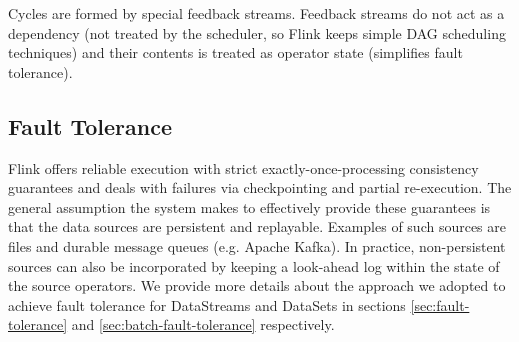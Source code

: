 Cycles are formed by special feedback streams. Feedback streams do not act as a dependency (not treated by the scheduler, so Flink keeps simple DAG scheduling techniques) and their contents is treated as operator state (simplifies fault tolerance). 

\subsection{Fault Tolerance}
Flink offers reliable execution with strict exactly-once-processing consistency guarantees and deals with failures via checkpointing and partial re-execution. The general assumption the system makes to effectively provide these guarantees is that the data sources are persistent and replayable. Examples of such sources are files and durable message queues (e.g. Apache Kafka). In practice, non-persistent sources can also be incorporated by keeping a look-ahead log within the state of the source operators. We provide more details about the approach we adopted to achieve fault tolerance for DataStreams and DataSets in sections \ref{sec:fault-tolerance} and \ref{sec:batch-fault-tolerance} respectively.







































